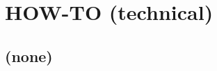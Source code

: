 
\cleardoublepage


\chapter{HOW-TO (technical)}\label{ch:how-to-technical}

\hfill \break

\newpage

\section{(none)}

